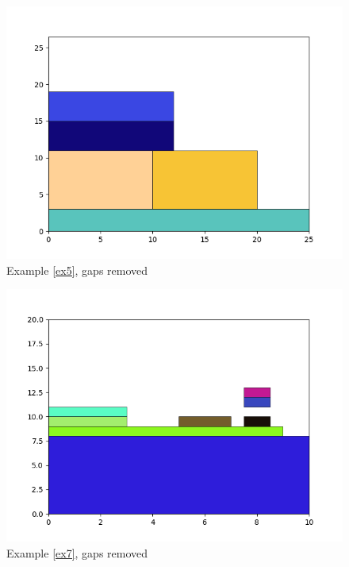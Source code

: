 \documentclass{article}
\theoremstyle{definition}
\theoremstyle{theorem}
\numberwithin{proposition}{section}
\begin{document}
        \begin{figure}[H]
            \centering
            \includegraphics[scale=0.5]{../examples/no-gaps-5.png}
            \caption{Example \ref{ex5}, gaps removed}
        \end{figure} 
        \begin{figure}[H]
            \centering
            \includegraphics[scale=0.5]{../examples/no-gaps-7.png}
            \caption{Example \ref{ex7}, gaps removed}
        \end{figure}
\end{document}

